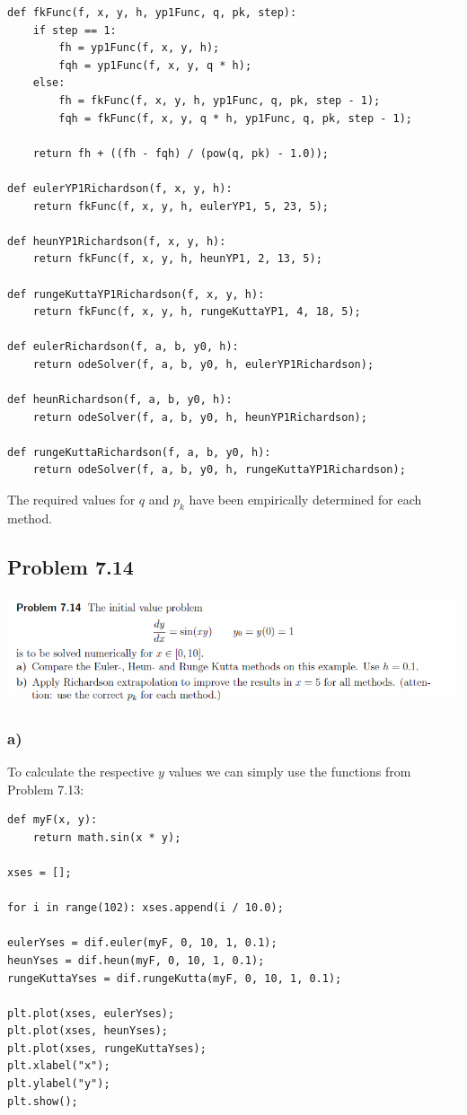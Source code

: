 \begin{lstlisting}[caption=Problem 7.13 b)]
def fkFunc(f, x, y, h, yp1Func, q, pk, step):
	if step == 1:
		fh = yp1Func(f, x, y, h);
		fqh = yp1Func(f, x, y, q * h);
	else:
		fh = fkFunc(f, x, y, h, yp1Func, q, pk, step - 1);
		fqh = fkFunc(f, x, y, q * h, yp1Func, q, pk, step - 1);
	
	return fh + ((fh - fqh) / (pow(q, pk) - 1.0));

def eulerYP1Richardson(f, x, y, h):
	return fkFunc(f, x, y, h, eulerYP1, 5, 23, 5);

def heunYP1Richardson(f, x, y, h):
	return fkFunc(f, x, y, h, heunYP1, 2, 13, 5);

def rungeKuttaYP1Richardson(f, x, y, h):
	return fkFunc(f, x, y, h, rungeKuttaYP1, 4, 18, 5);

def eulerRichardson(f, a, b, y0, h):
	return odeSolver(f, a, b, y0, h, eulerYP1Richardson);

def heunRichardson(f, a, b, y0, h):
	return odeSolver(f, a, b, y0, h, heunYP1Richardson);

def rungeKuttaRichardson(f, a, b, y0, h):
	return odeSolver(f, a, b, y0, h, rungeKuttaYP1Richardson);
\end{lstlisting}

The required values for $q$ and $p_{k}$ have been empirically determined for each method.


\subsection{Problem 7.14}


\includegraphics[width=1\textwidth]{chapters/images/desc-7-14}


\subsubsection{a)}

To calculate the respective $y$ values we can simply use the functions from Problem 7.13:

\begin{lstlisting}[caption=Problem 7.14 a)]
def myF(x, y):
	return math.sin(x * y);

xses = [];

for i in range(102): xses.append(i / 10.0);

eulerYses = dif.euler(myF, 0, 10, 1, 0.1);
heunYses = dif.heun(myF, 0, 10, 1, 0.1);
rungeKuttaYses = dif.rungeKutta(myF, 0, 10, 1, 0.1);

plt.plot(xses, eulerYses);
plt.plot(xses, heunYses);
plt.plot(xses, rungeKuttaYses);
plt.xlabel("x");
plt.ylabel("y");
plt.show();
\end{lstlisting}

